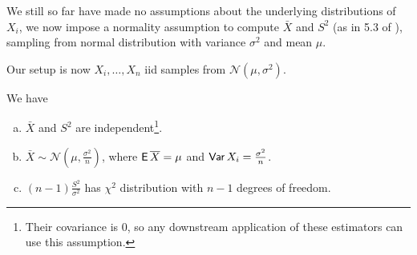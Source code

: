 We still so far have made no assumptions about the underlying distributions of $X_i$, we now impose a normality assumption to compute $\bar{X}$ and $S^2$ (as in 5.3 of \cite{casella2002statistical}), sampling from normal distribution with variance $\sigma^2$ and mean $\mu$.

Our setup is now $X_i, \dots, X_n$ iid samples from $\mathcal{N}(\mu, \sigma^2)$.

\begin{theorem}
    We have
    \begin{enumerate}[a)]
        \item $\bar{X}$ and $S^2$ are independent\footnote{Their covariance is $0$, so any downstream application of these estimators can use this assumption.}.
        \item $\bar{X}\sim \mathcal{N}(\mu, \frac{\sigma^2}{n})$, where $\operatorname{\mathsf{E}}\overline{X} = \mu$ and $\operatorname{\mathsf{Var}} X_i = \frac{\sigma^2}{n}$.
        \item $(n-1)\frac{S^2}{\sigma^2}$ has $\chi^2$ distribution with $n-1$ degrees of freedom.
    \end{enumerate}
\end{theorem}
